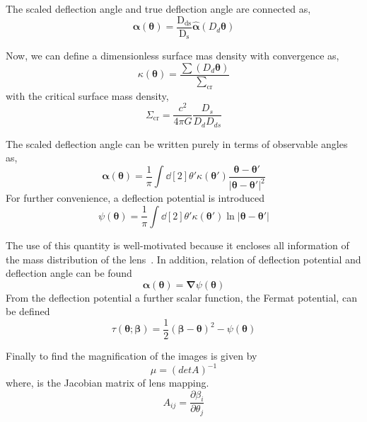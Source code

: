 The scaled deflection angle and true deflection angle are connected as,
\begin{equation}
\pmb\alpha(\pmb\theta)=\frac{\text{D}_{\text{ds}}}{\text{D}_{\text{s}}} \hat{\pmb\alpha}(D_{d}\pmb\theta)
\end{equation}

Now, we can define a dimensionless surface mas density with convergence as,
\begin{equation}
\kappa(\pmb\theta)=\frac{\sum(D_{d} \pmb \theta)}{\sum_\text{cr}}
\label{Equ:KTheta}
\end{equation}
with the critical surface mass density,
\begin{equation}
\Sigma_\text{cr}=\frac{c^2}{4\pi G}\frac{D_{s}}{D_{d}D_{ds}}
\label{SumCr}
\end{equation}

The scaled deflection angle can be written purely in terms of observable angles as,
\begin{equation}
\pmb\alpha(\pmb\theta)=\frac{1}{\pi}\int \dd[2]{\theta'} \kappa(\pmb{\theta}')\frac{\pmb\theta-\pmb\theta'}{| \pmb\theta -\pmb\theta'| ^2}
\label{ScaledDA}
\end{equation} 
For further convenience, a deflection potential is introduced
\begin{equation}
\psi(\pmb\theta)=\frac{1}{\pi}\int \dd[2]{\theta'} \kappa(\pmb\theta') \ln | \pmb\theta- \pmb\theta'| 
\label{psiTheta}
\end{equation}

The use of this quantity is well-motivated because it encloses all information of the mass distribution of the lens~\cite{manual}. In addition, relation of deflection potential and deflection angle can be found
\begin{equation}
\pmb\alpha(\pmb\theta)=\pmb\nabla\psi(\pmb\theta)
\label{Equ:AlphaTheta}
\end{equation}
From the deflection potential a further scalar function, the Fermat potential, can be defined
\begin{equation}
\tau(\pmb\theta; \pmb\beta)=\frac{1}{2}(\pmb\beta -\pmb\theta)^2 -\psi(\pmb\theta)
\label{Equ:Format}
\end{equation}

Finally to find the magnification of the images is given by
\begin{equation}
\mu =(det A)^{-1}
\end{equation}
where,  is the Jacobian matrix of lens mapping.
\begin{equation}
A_{ij}=\frac{\partial\beta_{i}}{\partial \theta_{j}}
\end{equation}\\

